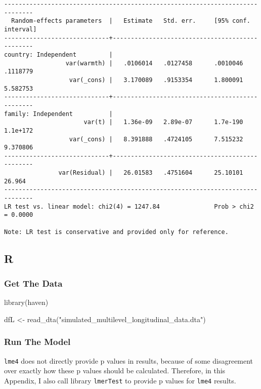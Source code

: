 \documentclass[
  letterpaper,
  DIV=11,
  numbers=noendperiod]{scrreprt}
\newenvironment{Shaded}{\begin{snugshade}}{\end{snugshade}}
\newcommand{\FunctionTok}[1]{\textcolor[rgb]{0.28,0.35,0.67}{#1}}
\newcommand{\NormalTok}[1]{\textcolor[rgb]{0.00,0.23,0.31}{#1}}
\newcommand{\OtherTok}[1]{\textcolor[rgb]{0.00,0.23,0.31}{#1}}
\newcommand{\StringTok}[1]{\textcolor[rgb]{0.13,0.47,0.30}{#1}}
\begin{document}
\begin{verbatim}
------------------------------------------------------------------------------
  Random-effects parameters  |   Estimate   Std. err.     [95% conf. interval]
-----------------------------+------------------------------------------------
country: Independent         |
                 var(warmth) |   .0106014   .0127458      .0010046    .1118779
                  var(_cons) |   3.170089   .9153354      1.800091    5.582753
-----------------------------+------------------------------------------------
family: Independent          |
                      var(t) |   1.36e-09   2.89e-07      1.7e-190    1.1e+172
                  var(_cons) |   8.391888   .4724105      7.515232    9.370806
-----------------------------+------------------------------------------------
               var(Residual) |   26.01583   .4751604      25.10101      26.964
------------------------------------------------------------------------------
LR test vs. linear model: chi2(4) = 1247.84               Prob > chi2 = 0.0000

Note: LR test is conservative and provided only for reference.
\end{verbatim}

\subsection{R}

\subsubsection{Get The Data}\label{get-the-data-4}

\begin{Shaded}
\begin{Highlighting}[]
\FunctionTok{library}\NormalTok{(haven)}

\NormalTok{dfL }\OtherTok{\textless{}{-}} \FunctionTok{read\_dta}\NormalTok{(}\StringTok{"simulated\_multilevel\_longitudinal\_data.dta"}\NormalTok{)}
\end{Highlighting}
\end{Shaded}

\subsubsection{Run The Model}\label{run-the-model-4}

\begin{tcolorbox}[enhanced jigsaw, colframe=quarto-callout-caution-color-frame, bottomrule=.15mm, opacitybacktitle=0.6, bottomtitle=1mm, toptitle=1mm, colbacktitle=quarto-callout-caution-color!10!white, arc=.35mm, toprule=.15mm, opacityback=0, rightrule=.15mm, title=\textcolor{quarto-callout-caution-color}{\faFire}\hspace{0.5em}{Caution}, leftrule=.75mm, colback=white, breakable, coltitle=black, left=2mm, titlerule=0mm]

\texttt{lme4} does not directly provide p values in results, because of
some disagreement over exactly how these p values should be calculated.
Therefore, in this Appendix, I also call library \texttt{lmerTest} to
provide p values for \texttt{lme4} results.

\end{tcolorbox}
\end{document}
